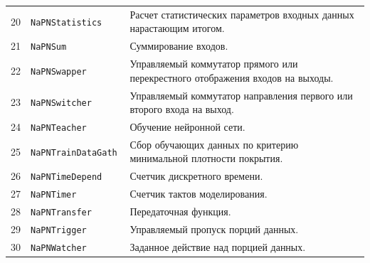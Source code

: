 \begin{table}
\begin{tabular}{|l|l|p{11.5cm}|}
20 & \tt NaPNStatistics & Расчет статистических параметров входных данных нарастающим итогом. \\
21 & \tt NaPNSum & Суммирование входов. \\
22 & \tt NaPNSwapper & Управляемый коммутатор прямого или перекрестного отображения входов на выходы. \\
23 & \tt NaPNSwitcher & Управляемый коммутатор направления первого или второго входа на выход. \\
24 & \tt NaPNTeacher & Обучение нейронной сети. \\
25 & \tt NaPNTrainDataGath & Сбор обучающих данных по критерию минимальной плотности покрытия. \\
26 & \tt NaPNTimeDepend & Счетчик дискретного времени. \\
27 & \tt NaPNTimer & Счетчик тактов моделирования. \\
28 & \tt NaPNTransfer & Передаточная функция. \\
29 & \tt NaPNTrigger & Управляемый пропуск порций данных. \\
30 & \tt NaPNWatcher & Заданное действие над порцией данных.\\
\hline
\end{tabular}
\end{table}


%
